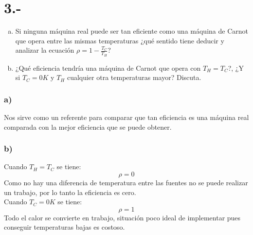 \documentclass{article}
\begin{document}
\section*{3.-}
\begin{enumerate}[a)]
    \item Si ninguna máquina real puede ser tan eficiente como una máquina de Carnot que opera entre las mismas 
    temperaturas ¿qué sentido tiene deducir y analizar la ecuación $\rho = 1- \frac{T_C}{T_H}$?
    \item ¿Qué eficiencia tendría una máquina de Carnot que opera con $T_H = T_C$?,
    ¿Y si $T_C=0K$ y $T_H$ cualquier otra temperaturas mayor? Discuta. 
\end{enumerate}
\begin{tcolorbox}[breakable]
    \subsubsection*{a)}
    Nos sirve como un referente para comparar que tan eficiencia es una máquina real comparada con la 
    mejor eficiencia que se puede obtener.
    \subsubsection*{b)}
    Cuando $T_H = T_C$ se tiene:
    \[ \rho = 0\]
    Como no hay una diferencia de temperatura entre las fuentes no se puede realizar un trabajo, 
    por lo tanto la eficiencia es cero. \\ 
    Cuando $T_C=0K$ se tiene:
    \[ \rho = 1 \]
    Todo el calor se convierte en trabajo, situación poco ideal de implementar pues conseguir 
    temperaturas bajas es costoso.
\end{tcolorbox}
\end{document}
